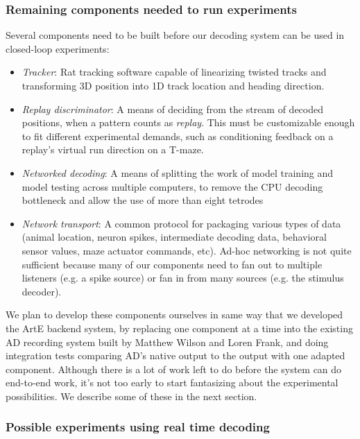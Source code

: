 \documentclass[]{article}
\begin{document}
\subsubsection{Remaining components needed to run experiments}

Several components need to be built before our decoding system can be
used in closed-loop experiments:

\begin{itemize}
\itemsep1pt\parskip0pt
\item
  \emph{Tracker}: Rat tracking software capable of linearizing twisted
  tracks and transforming 3D position into 1D track location and heading
  direction.
\item
  \emph{Replay discriminator}: A means of deciding from the stream of
  decoded positions, when a pattern counts as \emph{replay}. This must
  be customizable enough to fit different experimental demands, such as
  conditioning feedback on a replay's virtual run direction on a T-maze.
\item
  \emph{Networked decoding}: A means of splitting the work of model
  training and model testing across multiple computers, to remove the
  CPU decoding bottleneck and allow the use of more than eight tetrodes
\item
  \emph{Network transport}: A common protocol for packaging various
  types of data (animal location, neuron spikes, intermediate decoding
  data, behavioral sensor values, maze actuator commands, etc). Ad-hoc
  networking is not quite sufficient because many of our components need
  to fan out to multiple listeners (e.g. a spike source) or fan in from
  many sources (e.g. the stimulus decoder).
\end{itemize}

We plan to develop these components ourselves in same way that we
developed the ArtE backend system, by replacing one component at a time
into the existing AD recording system built by Matthew Wilson and Loren
Frank, and doing integration tests comparing AD's native output to the
output with one adapted component. Although there is a lot of work left
to do before the system can do end-to-end work, it's not too early to
start fantasizing about the experimental possibilities. We describe some
of these in the next section.

\subsubsection{Possible experiments using real time decoding}
\end{document}
